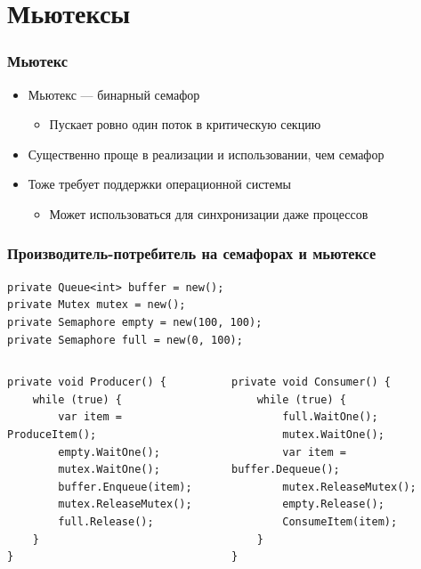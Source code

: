 \documentclass{../../slides-style}
\begin{document}
    \section{Мьютексы}

    \begin{frame}
        \frametitle{Мьютекс}
        \begin{itemize}
            \item Мьютекс --- бинарный семафор
            \begin{itemize}
                \item Пускает ровно один поток в критическую секцию
            \end{itemize}
            \item Существенно проще в реализации и использовании, чем семафор
            \item Тоже требует поддержки операционной системы
            \begin{itemize}
                \item Может использоваться для синхронизации даже процессов
            \end{itemize}
        \end{itemize}
    \end{frame}

    \begin{frame}[fragile]
        \frametitle{Производитель-потребитель на семафорах и мьютексе}
        \begin{footnotesize}
            \begin{verbatim}
private Queue<int> buffer = new();
private Mutex mutex = new();
private Semaphore empty = new(100, 100);
private Semaphore full = new(0, 100);
            \end{verbatim}
            \begin{columns}
                \begin{column}{0.5\textwidth}
                    \begin{verbatim}
private void Producer() {
    while (true) {
        var item = ProduceItem();
        empty.WaitOne();
        mutex.WaitOne();
        buffer.Enqueue(item);
        mutex.ReleaseMutex();
        full.Release();
    }
}
                    \end{verbatim}
                \end{column}
                \begin{column}{0.5\textwidth}
                    \begin{verbatim}
private void Consumer() {
    while (true) {
        full.WaitOne();
        mutex.WaitOne();
        var item = buffer.Dequeue();
        mutex.ReleaseMutex();
        empty.Release();
        ConsumeItem(item);
    }
}
                    \end{verbatim}
                \end{column}
            \end{columns}
        \end{footnotesize}
    \end{frame}
\end{document}
